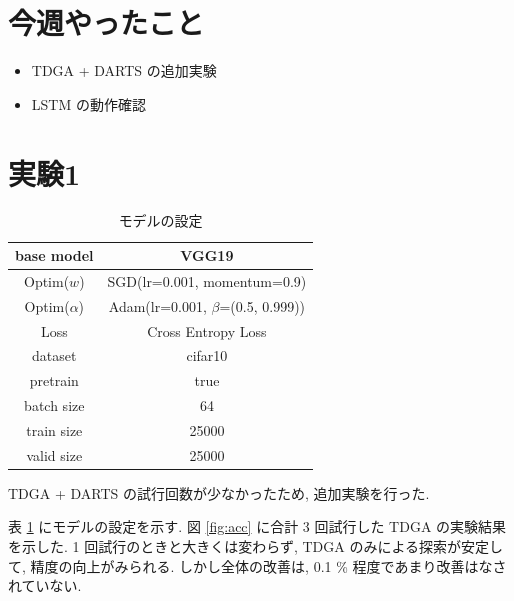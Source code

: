 \documentclass[twocolumn]{jarticle}     %
\begin{document}


\section{今週やったこと}
\begin{itemize}
  \item TDGA + DARTS の追加実験
  \item LSTM の動作確認
\end{itemize}


\section{実験1}

\begin{table}[tb]
  \begin{center}
    \caption{モデルの設定}
    \begin{tabular}{|c|c|} \hline
      base model & VGG19 \\ \hline
      Optim($w$) & SGD(lr=0.001, momentum=0.9) \\ \hline
      Optim($\alpha$) & Adam(lr=0.001, $\beta$=(0.5, 0.999)) \\ \hline
      Loss & Cross Entropy Loss \\ \hline
      dataset & cifar10 \\ \hline
      pretrain & true \\ \hline
      batch size & 64 \\ \hline
      train size & 25000 \\ \hline
      valid size & 25000 \\ \hline
    \end{tabular}
    \label{tab:setting}
  \end{center}
\end{table}

TDGA + DARTS の試行回数が少なかったため, 追加実験を行った.

表 \ref{tab:setting} にモデルの設定を示す.
図 \ref{fig:acc} に合計 3 回試行した TDGA の実験結果を示した.
1 回試行のときと大きくは変わらず, TDGA のみによる探索が安定して, 精度の向上がみられる.
しかし全体の改善は, 0.1 \% 程度であまり改善はなされていない.
\end{document}
